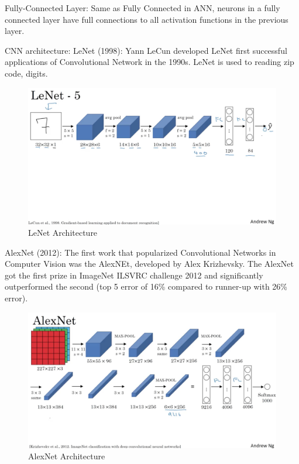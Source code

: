Fully-Connected Layer:
Same as Fully Connected in ANN, neurons in a fully connected layer have full connections to all activation functions in the previous layer. 

CNN architecture:
LeNet (1998): Yann LeCun developed LeNet first successful applications of Convolutional Network in the 1990s. LeNet is used to reading zip code, digits.
\begin{center}
  \begin{figure}[H]
  \centering
  \includegraphics[width=1\columnwidth]{images/chap2/LeNet.png}
  \caption{LeNet Architecture}
  \label{chap2:WSP}
  \end{figure}
\end{center}
AlexNet (2012): The first work that popularized Convolutional Networks in Computer Vision was the AlexNEt, developed by Alex Krizhevsky. The AlexNet got the first prize in ImageNet ILSVRC challenge 2012 and significantly outperformed the second (top 5 error of 16\% compared to runner-up with 26\% error).  
\begin{center}
  \begin{figure}[H]
  \centering
  \includegraphics[width=1\columnwidth]{images/chap2/AlexNet.png}
  \caption{AlexNet Architecture}
  \label{chap2:WSP}
  \end{figure}
\end{center}
